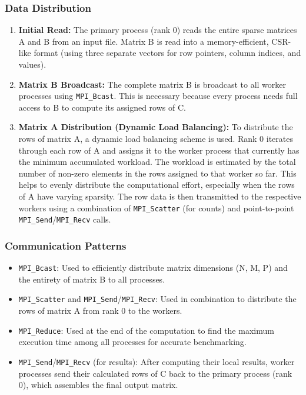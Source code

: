 \documentclass{article}
\begin{document}
\subsubsection{Data Distribution}
\begin{enumerate}
    \item \textbf{Initial Read:} The primary process (rank 0) reads the entire sparse matrices A and B from an input file. Matrix B is read into a memory-efficient, CSR-like format (using three separate vectors for row pointers, column indices, and values).
    \item \textbf{Matrix B Broadcast:} The complete matrix B is broadcast to all worker processes using \texttt{MPI\_Bcast}. This is necessary because every process needs full access to B to compute its assigned rows of C.
    \item \textbf{Matrix A Distribution (Dynamic Load Balancing):} To distribute the rows of matrix A, a dynamic load balancing scheme is used. Rank 0 iterates through each row of A and assigns it to the worker process that currently has the minimum accumulated workload. The workload is estimated by the total number of non-zero elements in the rows assigned to that worker so far. This helps to evenly distribute the computational effort, especially when the rows of A have varying sparsity. The row data is then transmitted to the respective workers using a combination of \texttt{MPI\_Scatter} (for counts) and point-to-point \texttt{MPI\_Send}/\texttt{MPI\_Recv} calls.
\end{enumerate}

\subsubsection{Communication Patterns}
\begin{itemize}
    \item \texttt{MPI\_Bcast}: Used to efficiently distribute matrix dimensions (N, M, P) and the entirety of matrix B to all processes.
    \item \texttt{MPI\_Scatter} and \texttt{MPI\_Send}/\texttt{MPI\_Recv}: Used in combination to distribute the rows of matrix A from rank 0 to the workers.
    \item \texttt{MPI\_Reduce}: Used at the end of the computation to find the maximum execution time among all processes for accurate benchmarking.
    \item \texttt{MPI\_Send}/\texttt{MPI\_Recv} (for results): After computing their local results, worker processes send their calculated rows of C back to the primary process (rank 0), which assembles the final output matrix.
\end{itemize}
\end{document}
